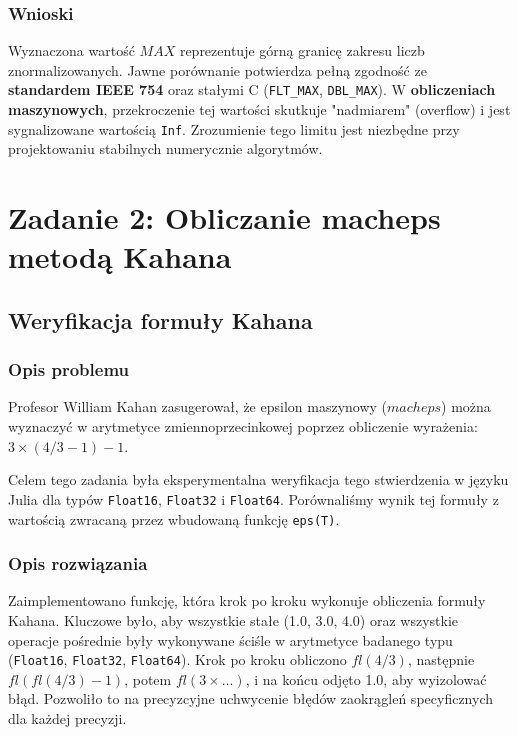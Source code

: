 \documentclass[12pt,a4paper]{article}
\begin{document}
\subsubsection{Wnioski}
Wyznaczona wartość $MAX$ reprezentuje górną granicę zakresu liczb znormalizowanych. Jawne porównanie potwierdza pełną zgodność ze \textbf{standardem IEEE 754} oraz stałymi C (\texttt{FLT\_MAX}, \texttt{DBL\_MAX}). W \textbf{obliczeniach maszynowych}, przekroczenie tej wartości skutkuje "nadmiarem" (overflow) i jest sygnalizowane wartością \texttt{Inf}. Zrozumienie tego limitu jest niezbędne przy projektowaniu stabilnych numerycznie algorytmów.

\section{Zadanie 2: Obliczanie macheps metodą Kahana}

\subsection{Weryfikacja formuły Kahana}

\subsubsection{Opis problemu}
Profesor William Kahan zasugerował, że epsilon maszynowy ($macheps$) można wyznaczyć w arytmetyce zmiennoprzecinkowej poprzez obliczenie wyrażenia:
$3 \times (4/3 - 1) - 1$.

Celem tego zadania była eksperymentalna weryfikacja tego stwierdzenia w języku Julia dla typów \texttt{Float16}, \texttt{Float32} i \texttt{Float64}. Porównaliśmy wynik tej formuły z wartością zwracaną przez wbudowaną funkcję \texttt{eps(T)}.

\subsubsection{Opis rozwiązania}
Zaimplementowano funkcję, która krok po kroku wykonuje obliczenia formuły Kahana. Kluczowe było, aby wszystkie stałe (1.0, 3.0, 4.0) oraz wszystkie operacje pośrednie były wykonywane ściśle w arytmetyce badanego typu (\texttt{Float16}, \texttt{Float32}, \texttt{Float64}). Krok po kroku obliczono $\textit{fl}(4/3)$, następnie $\textit{fl}(\textit{fl}(4/3) - 1)$, potem $\textit{fl}(3 \times \dots)$, i na końcu odjęto 1.0, aby wyizolować błąd. Pozwoliło to na precyzcyjne uchwycenie błędów zaokrągleń specyficznych dla każdej precyzji.
\end{document}
